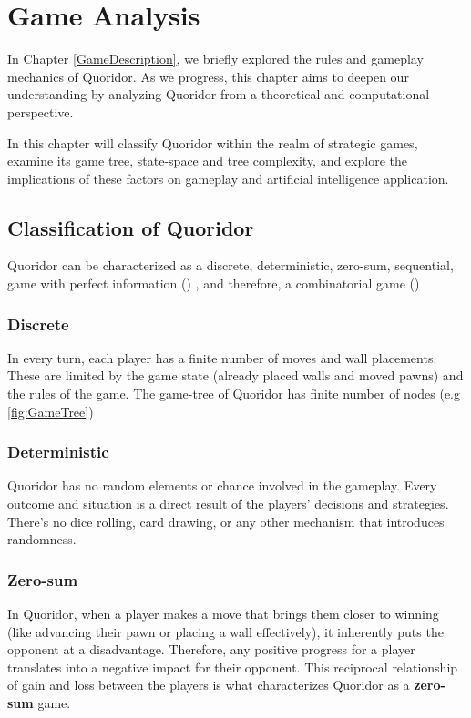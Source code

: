 \chapter{Game Analysis}

In Chapter \ref{GameDescription}, we briefly explored the rules and gameplay mechanics of Quoridor.
As we progress, this chapter aims to deepen our understanding by analyzing Quoridor from a
theoretical and computational perspective.

In this chapter will classify Quoridor within the realm of strategic games, examine its game tree,
state-space and tree complexity, and explore the implications of these factors on gameplay and
artificial intelligence application.

\section{Classification of Quoridor}

Quoridor can be characterized as a discrete, deterministic, zero-sum, sequential, game with perfect
information (\cite{Glendenning2002MasteringQ}) , and therefore, a combinatorial game (\cite{GameTheoryBook})

\subsection{Discrete}
In every turn, each player has a finite number of moves and wall placements. These are limited by the
game state (already placed walls and moved pawns) and the rules of the game. The game-tree of Quoridor
has finite number of nodes (e.g \ref{fig:GameTree})

\subsection{Deterministic}
Quoridor has no random elements or chance involved in the gameplay. Every outcome and situation
is a direct result of the players' decisions and strategies. There's no dice rolling,
card drawing, or any other mechanism that introduces randomness.

\subsection{Zero-sum}
In Quoridor, when a player makes a move that brings them closer to winning (like advancing their pawn
or placing a wall effectively), it inherently puts the opponent at a disadvantage. Therefore, any
positive progress for a player translates into a negative impact for their opponent. This reciprocal
relationship of gain and loss between the players is what characterizes Quoridor as a \textbf{zero-sum} game.

